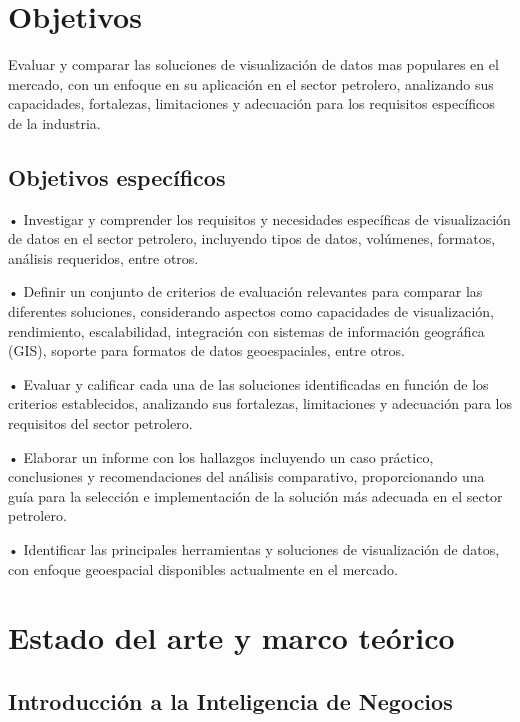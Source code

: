 \documentclass[
  11pt,
  bookmarksnumbered]{article}
\begin{document}
\hypertarget{objetivos}{%
\section{\texorpdfstring{\textbf{Objetivos}}{Objetivos}}\label{objetivos}}

Evaluar y comparar las soluciones de visualización de datos mas populares en el mercado, con un enfoque en su aplicación en el sector petrolero, analizando sus capacidades, fortalezas, limitaciones y adecuación para los requisitos específicos de la industria.

\hypertarget{objetivos-especuxedficos}{%
\subsection{Objetivos específicos}\label{objetivos-especuxedficos}}

• Investigar y comprender los requisitos y necesidades específicas de visualización de datos en el sector petrolero, incluyendo tipos de datos, volúmenes, formatos, análisis requeridos, entre otros.

• Definir un conjunto de criterios de evaluación relevantes para comparar las diferentes soluciones, considerando aspectos como capacidades de visualización, rendimiento, escalabilidad, integración con sistemas de información geográfica (GIS), soporte para formatos de datos geoespaciales, entre otros.

• Evaluar y calificar cada una de las soluciones identificadas en función de los criterios establecidos, analizando sus fortalezas, limitaciones y adecuación para los requisitos del sector petrolero.

• Elaborar un informe con los hallazgos incluyendo un caso práctico, conclusiones y recomendaciones del análisis comparativo, proporcionando una guía para la selección e implementación de la solución más adecuada en el sector petrolero.

• Identificar las principales herramientas y soluciones de visualización de datos, con enfoque geoespacial disponibles actualmente en el mercado.

\hypertarget{estado-del-arte-y-marco-teuxf3rico}{%
\section{\texorpdfstring{\textbf{Estado del arte y marco teórico}}{Estado del arte y marco teórico}}\label{estado-del-arte-y-marco-teuxf3rico}}

\hypertarget{introducciuxf3n-a-la-inteligencia-de-negocios}{%
\subsection{Introducción a la Inteligencia de Negocios}\label{introducciuxf3n-a-la-inteligencia-de-negocios}}
\end{document}
